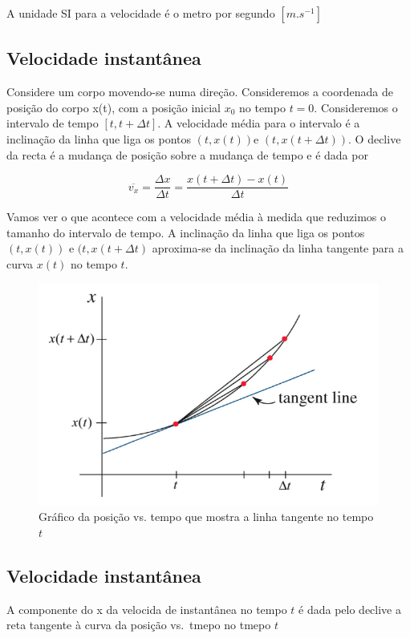 \documentclass[
  portuguese,
  ]{book}
\begin{document}
A unidade SI para a velocidade é o metro por segundo \([m.s^{-1}]\)

\hypertarget{velocidade-instantuxe2nea}{%
\subsection{Velocidade instantânea}\label{velocidade-instantuxe2nea}}

Considere um corpo movendo-se numa direção. Consideremos a coordenada de posição do corpo x(t), com a posição inicial \(x_0\) no tempo \(t = 0\). Consideremos o intervalo de tempo \([t, t + \Delta t]\). A velocidade média para o intervalo é a inclinação da linha que liga os pontos \((t, x (t))\)e \((t, x (t + \Delta t))\). O declive da recta é a mudança de posição sobre a mudança de tempo e é dada por

\[\overline{v_x}=\frac{\Delta x}{\Delta t}=\frac{x(t+ \Delta t)-x(t)}{\Delta t} \]

Vamos ver o que acontece com a velocidade média à medida que reduzimos o tamanho do intervalo de tempo. A inclinação da linha que liga os pontos \((t, x (t))\) e \((t, x (t + \Delta t)\) aproxima-se da inclinação da linha tangente para a curva \(x(t)\) no tempo \(t\).

\begin{figure}

{\centering \includegraphics[width=0.4\linewidth]{img/4} 

}

\caption{Gráfico da posição vs. tempo que mostra a linha tangente no tempo $t$}\label{fig:img4}
\end{figure}

\hypertarget{velocidade-instantuxe2nea-1}{%
\subsection{Velocidade instantânea}\label{velocidade-instantuxe2nea-1}}

A componente do x da velocida de instantânea no tempo \(t\) é dada pelo declive a reta tangente à curva da posição vs.~tmepo no tmepo \(t\)
\end{document}

